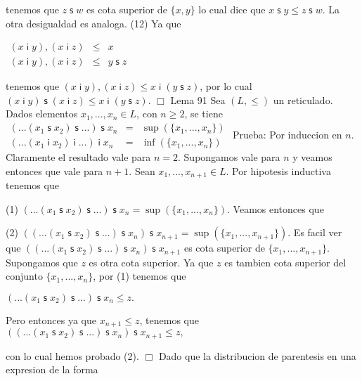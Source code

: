 tenemos que \(z\;\mathsf{s}\;w\) es cota superior de \(\{x,y\}\) lo cual dice que \(x\;\mathsf{s}\;y\leq z\;\mathsf{s}\;w\). La otra desigualdad es analoga.
(12) Ya que

\(\displaystyle \begin{array}{rcl} (x\mathsf{\;i\;}y),(x\mathsf{\;i\;}z) & \leq & x \\ (x\mathsf{\;i\;}y),(x\mathsf{\;i\;}z) & \leq & y\;\mathsf{s}\;z \end{array} \)

tenemos que \((x\;\mathsf{i}\;y),(x\mathsf{\;i\;}z)\leq x\mathsf{\;i\;}(y\; \mathsf{s}\;z)\), por lo cual \((x\mathsf{\;i\;}y)\;\mathsf{s}\;(x\mathsf{\;i\; }z)\leq x\mathsf{\;i\;}(y\;\mathsf{s}\;z)\). \(\Box\)
Lema 91 Sea \((L,\leq )\) un reticulado. Dados elementos \(x_{1},...,x_{n}\in L\), con \( n\geq 2\), se tiene
\(\displaystyle \begin{array}{rcl} (...(x_{1}\;\mathsf{s\;}x_{2})\;\mathsf{s\;}...)\;\mathsf{s\;}x_{n} & =& \sup (\{x_{1},...,x_{n}\}) \\ (...(x_{1}\mathsf{\;i\;}x_{2})\mathsf{\;i\;}...)\mathsf{\;i\;}x_{n} & =& \inf (\{x_{1},...,x_{n}\}) \end{array} \)
Prueba: Por induccion en \(n\). Claramente el resultado vale para \(n=2\). Supongamos vale para \(n\) y veamos entonces que vale para \(n+1\). Sean \( x_{1},...,x_{n+1}\in L\). Por hipotesis inductiva tenemos que

(1) \((...(x_{1}\;\mathsf{s}\;x_{2})\;\mathsf{s\;}...)\;\mathsf{s\;} x_{n}=\sup (\{x_{1},...,x_{n}\}).\)
Veamos entonces que

(2) \(((...(x_{1}\;\mathsf{s\;}x_{2})\;\mathsf{s\;}...)\;\mathsf{s\;} x_{n})\;\mathsf{s\;}x_{n+1}=\sup (\{x_{1},...,x_{n+1}\}).\)
Es facil ver que \(((...(x_{1}\;\mathsf{s\;}x_{2})\;\mathsf{s\;} ...)\;\mathsf{s\;}x_{n})\;\mathsf{s\;}x_{n+1}\) es cota superior de \( \{x_{1},...,x_{n+1}\}\). Supongamos que \(z\) es otra cota superior. Ya que \(z\) es tambien cota superior del conjunto \(\{x_{1},...,x_{n}\}\), por (1) tenemos que

\(\displaystyle (...(x_{1}\;\mathsf{s\;}x_{2})\;\mathsf{s}\;...)\;\mathsf{s\;}x_{n}\leq z. \)

Pero entonces ya que \(x_{n+1}\leq z\), tenemos que
\(\displaystyle ((...(x_{1}\;\mathsf{s\;}x_{2})\;\mathsf{s\;}...)\;\mathsf{s\;}x_{n})\; \mathsf{s\;}x_{n+1}\leq z, \)

con lo cual hemos probado (2). \(\Box\)
Dado que la distribucion de parentesis en una expresion de la forma

